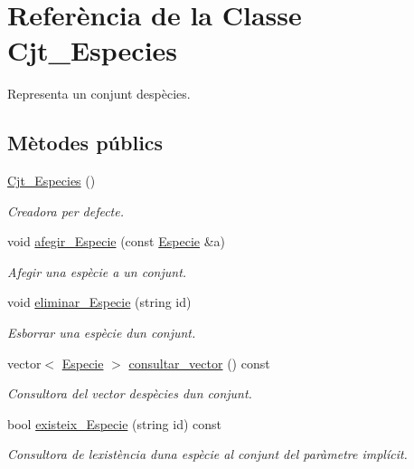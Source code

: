 \hypertarget{class_cjt___especies}{}\section{Referència de la Classe Cjt\+\_\+\+Especies}
\label{class_cjt___especies}


Representa un conjunt d\textquotesingle{}espècies.  


\subsection*{Mètodes públics}
\begin{DoxyCompactItemize}
\item 
\hyperlink{class_cjt___especies_ae423b9d5a456158136c17d9210c90c2e}{Cjt\+\_\+\+Especies} ()
\begin{DoxyCompactList}\small\item\em Creadora per defecte. \end{DoxyCompactList}\item 
void \hyperlink{class_cjt___especies_a4ac8e8ed749e7e33b0c84da57226081c}{afegir\+\_\+\+Especie} (const \hyperlink{class_especie}{Especie} \&a)
\begin{DoxyCompactList}\small\item\em Afegir una espècie a un conjunt. \end{DoxyCompactList}\item 
void \hyperlink{class_cjt___especies_af1259ace6df2a61d5c443a906a2f0a44}{eliminar\+\_\+\+Especie} (string id)
\begin{DoxyCompactList}\small\item\em Esborrar una espècie d\textquotesingle{}un conjunt. \end{DoxyCompactList}\item 
vector$<$ \hyperlink{class_especie}{Especie} $>$ \hyperlink{class_cjt___especies_a36c1c182c1a1c9892c96a18153e9dd05}{consultar\+\_\+vector} () const
\begin{DoxyCompactList}\small\item\em Consultora del vector d\textquotesingle{}espècies d\textquotesingle{}un conjunt. \end{DoxyCompactList}\item 
bool \hyperlink{class_cjt___especies_acd5a61de448f77d0356e0ba8d642b2e0}{existeix\+\_\+\+Especie} (string id) const
\begin{DoxyCompactList}\small\item\em Consultora de l\textquotesingle{}existència d\textquotesingle{}una espècie al conjunt del paràmetre implícit. \end{DoxyCompactList}\item 

\end{DoxyCompactItemize}
